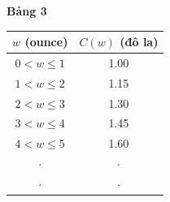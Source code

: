 \begin{minipage}[t]{0.265\textwidth}
    \vspace{8pt}
    \begin{center}
        \textbf{\textsf{Bảng 3}}\\[3pt]
        \renewcommand{\arraystretch}{1.1}
        \begin{tabular}{|c|c|}
            \hline
            \rowcolor{blue!10}
            $w$ (ounce) & $C(w)$ (đô la) \\
            \hline
            $0 < w \le 1$ & 1.00 \\
            $1 < w \le 2$ & 1.15 \\
            $2 < w \le 3$ & 1.30 \\
            $3 < w \le 4$ & 1.45 \\
            $4 < w \le 5$ & 1.60 \\
            $\cdot$       & $\cdot$ \\
            $\cdot$       & $\cdot$ \\
            \hline
        \end{tabular}
    \end{center}
\end{minipage}%
\hfill
